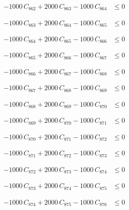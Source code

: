 \documentclass[a4paper,11pt]{article}
\begin{document}
\begin{align}
-1000\,C_{862} + 2000\,C_{863} - 1000\,C_{864} &\leq 0 \nonumber
\end{align}

\begin{align}
-1000\,C_{863} + 2000\,C_{864} - 1000\,C_{865} &\leq 0 \nonumber
\end{align}

\begin{align}
-1000\,C_{864} + 2000\,C_{865} - 1000\,C_{866} &\leq 0 \nonumber
\end{align}

\begin{align}
-1000\,C_{865} + 2000\,C_{866} - 1000\,C_{867} &\leq 0 \nonumber
\end{align}

\begin{align}
-1000\,C_{866} + 2000\,C_{867} - 1000\,C_{868} &\leq 0 \nonumber
\end{align}

\begin{align}
-1000\,C_{867} + 2000\,C_{868} - 1000\,C_{869} &\leq 0 \nonumber
\end{align}

\begin{align}
-1000\,C_{868} + 2000\,C_{869} - 1000\,C_{870} &\leq 0 \nonumber
\end{align}

\begin{align}
-1000\,C_{869} + 2000\,C_{870} - 1000\,C_{871} &\leq 0 \nonumber
\end{align}

\begin{align}
-1000\,C_{870} + 2000\,C_{871} - 1000\,C_{872} &\leq 0 \nonumber
\end{align}

\begin{align}
-1000\,C_{871} + 2000\,C_{872} - 1000\,C_{873} &\leq 0 \nonumber
\end{align}

\begin{align}
-1000\,C_{872} + 2000\,C_{873} - 1000\,C_{874} &\leq 0 \nonumber
\end{align}

\begin{align}
-1000\,C_{873} + 2000\,C_{874} - 1000\,C_{875} &\leq 0 \nonumber
\end{align}

\begin{align}
-1000\,C_{874} + 2000\,C_{875} - 1000\,C_{876} &\leq 0 \nonumber
\end{align}
\end{document}
